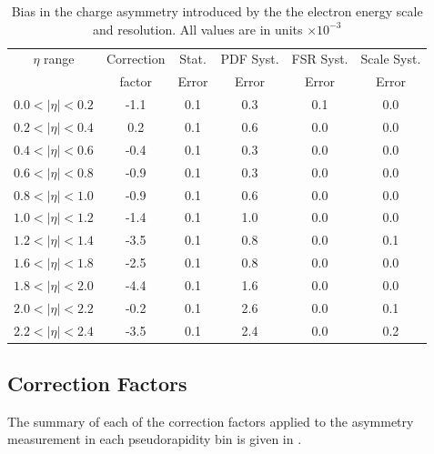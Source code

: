 \begin{table}[htbp]
  \begin{center}
    \begin{tabular}{cccccc}
\toprule
$\eta$ range & Correction  & Stat.   &PDF  Syst. &  FSR Syst. & Scale Syst.\\
          & factor & Error & Error   & Error  & Error  \\
     \midrule
 $0.0<|\eta|<0.2$ & -1.1 & 0.1 & 0.3  &0.1 & 0.0\\
 $0.2<|\eta|<0.4$ &  0.2 & 0.1 & 0.6  &0.0 & 0.0\\
 $0.4<|\eta|<0.6$ & -0.4 & 0.1 & 0.3  &0.0 & 0.0\\
 $0.6<|\eta|<0.8$ & -0.9 & 0.1 & 0.3  &0.0 & 0.0\\
 $0.8<|\eta|<1.0$ & -0.9 & 0.1 & 0.6  &0.0 & 0.0\\
 $1.0<|\eta|<1.2$ & -1.4 & 0.1 & 1.0  &0.0 & 0.0\\
 $1.2<|\eta|<1.4$ & -3.5 & 0.1 & 0.8  &0.0 & 0.1\\
 $1.6<|\eta|<1.8$ & -2.5 & 0.1 & 0.8  &0.0 & 0.0\\
 $1.8<|\eta|<2.0$ & -4.4 & 0.1 & 1.6  &0.0 & 0.0\\
 $2.0<|\eta|<2.2$ & -0.2 & 0.1 & 2.6  &0.0 & 0.1\\
 $2.2<|\eta|<2.4$ & -3.5 & 0.1 & 2.4  &0.0 & 0.2\\
\bottomrule
    \end{tabular}
    \caption{\label{tab:energyscalecorr}Bias in the charge asymmetry introduced by the the electron energy scale and resolution.
 All values are in units $\times 10^{-3}$}
  \end{center}
\end{table}

\subsection{Correction Factors}
The summary of each of the correction factors applied to the asymmetry
measurement in each pseudorapidity bin is given in
. 

